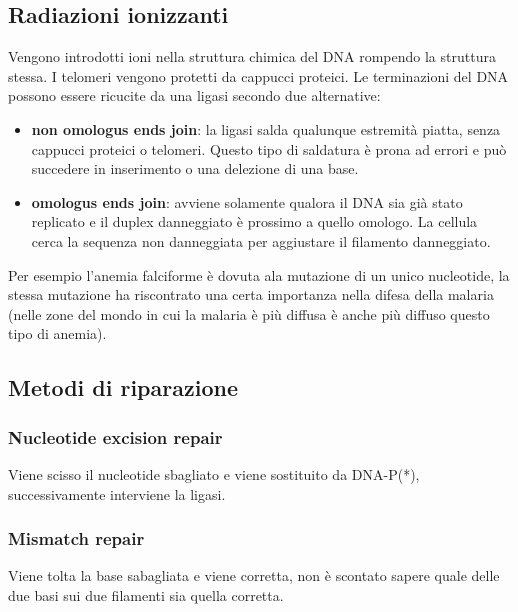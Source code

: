         \subsection{Radiazioni ionizzanti}
            Vengono introdotti ioni nella struttura chimica del DNA rompendo la struttura stessa.
            I telomeri vengono protetti da cappucci proteici.
            Le terminazioni del DNA possono essere ricucite da una ligasi secondo due alternative:
            \begin{itemize}
                \item \textbf{non omologus ends join}: la ligasi salda qualunque estremità piatta, senza cappucci proteici o telomeri. Questo tipo di saldatura è prona ad errori e può succedere in inserimento o una delezione di una base.
                \item \textbf{omologus ends join}: avviene solamente qualora il DNA sia già stato replicato e il duplex danneggiato è prossimo a quello omologo. La cellula cerca la sequenza non danneggiata per aggiustare il filamento danneggiato.
            \end{itemize} 
            Per esempio l'anemia falciforme è dovuta ala mutazione di un unico nucleotide, la stessa mutazione ha riscontrato una certa importanza nella difesa della malaria (nelle zone del mondo in cui la malaria è più diffusa è anche più diffuso questo tipo di anemia).\\
        
     \subsection{Metodi di riparazione}
        \subsubsection{Nucleotide excision repair}
            Viene scisso il nucleotide sbagliato e viene sostituito da DNA-P(*), successivamente interviene la ligasi.
        \subsubsection{Mismatch repair}
            Viene tolta la base sabagliata e viene corretta, non è scontato sapere quale delle due basi sui due filamenti sia quella corretta.

\pagebreak